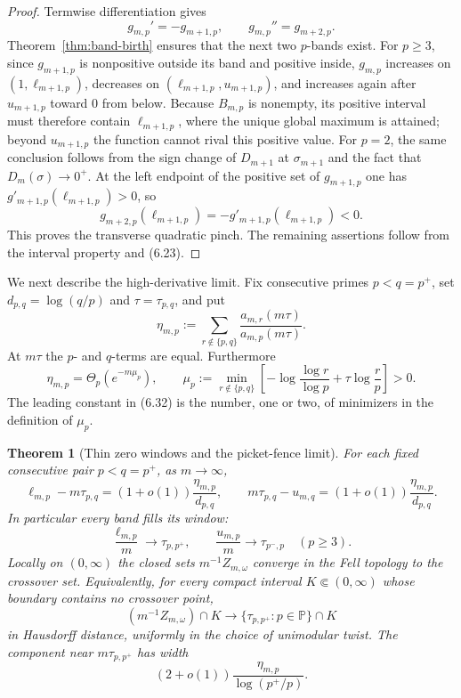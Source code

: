 \documentclass[11pt]{article}
\newtheorem{theorem}{Theorem}[section]
\theoremstyle{definition}
\theoremstyle{remark}
\newcommand{\PP}{\mathbb P}
\begin{document}
\begin{proof}
Termwise differentiation gives
\[
 g_{m,p}'=-g_{m+1,p},\qquad g_{m,p}''=g_{m+2,p}.
\tag{6.30}
\]
Theorem~\ref{thm:band-birth} ensures that the next two $p$-bands exist.
For $p\ge3$, since $g_{m+1,p}$ is nonpositive outside its band and positive
inside, $g_{m,p}$ increases on $(1,\ell_{m+1,p})$, decreases on
$(\ell_{m+1,p},u_{m+1,p})$, and increases again after $u_{m+1,p}$ toward
$0$ from below.  Because $B_{m,p}$ is nonempty, its positive interval must
therefore contain $\ell_{m+1,p}$, where the unique global maximum is
attained; beyond $u_{m+1,p}$ the function cannot rival this positive value.
For $p=2$, the same conclusion follows from the sign change of
$D_{m+1}$ at $\sigma_{m+1}$ and the fact that $D_m(\sigma)\to0^+$.
At the left endpoint of the positive set of
$g_{m+1,p}$ one has $g'_{m+1,p}(\ell_{m+1,p})>0$, so
\[
 g_{m+2,p}(\ell_{m+1,p})=-g'_{m+1,p}(\ell_{m+1,p})<0.
\]
This proves the transverse quadratic pinch.
The remaining assertions follow from the interval property and (6.23).
\end{proof}

We next describe the high-derivative limit.  Fix consecutive primes
$p<q=p^+$, set $d_{p,q}=\log(q/p)$ and $\tau=\tau_{p,q}$, and put
\[
 \eta_{m,p}:=
 \sum_{r\notin\{p,q\}}
 \frac{a_{m,r}(m\tau)}{a_{m,p}(m\tau)}.
\tag{6.31}
\]
At $m\tau$ the $p$- and $q$-terms are equal.  Furthermore
\[
 \eta_{m,p}=\Theta_p(e^{-m\mu_p}),\qquad
 \mu_p:=\min_{r\notin\{p,q\}}
 \left[-\log\frac{\log r}{\log p}+\tau\log\frac rp\right]>0.
\tag{6.32}
\]
The leading constant in (6.32) is the number, one or two, of minimizers in
the definition of $\mu_p$.

\begin{theorem}[Thin zero windows and the picket-fence limit]
\label{thm:picket-fence}
For each fixed consecutive pair $p<q=p^+$, as $m\to\infty$,
\[
 \ell_{m,p}-m\tau_{p,q}
  =(1+o(1))\frac{\eta_{m,p}}{d_{p,q}},
 \qquad
 m\tau_{p,q}-u_{m,q}
  =(1+o(1))\frac{\eta_{m,p}}{d_{p,q}}.
\tag{6.33}
\]
In particular every band fills its window:
\[
 \frac{\ell_{m,p}}m\longrightarrow\tau_{p,p^+},
 \qquad
 \frac{u_{m,p}}m\longrightarrow\tau_{p^-,p}\quad(p\ge3).
\tag{6.34}
\]
Locally on $(0,\infty)$ the closed sets $m^{-1}Z_{m,\omega}$ converge in the
Fell topology to the crossover set.  Equivalently, for every compact interval
$K\Subset(0,\infty)$ whose boundary contains no crossover point,
\[
 \left(m^{-1}Z_{m,\omega}\right)\cap K
 \longrightarrow
 \{\tau_{p,p^+}:p\in\PP\}\cap K
\tag{6.35}
\]
in Hausdorff distance, uniformly in the choice of unimodular twist.
The component near $m\tau_{p,p^+}$ has width
\[
 (2+o(1))\frac{\eta_{m,p}}{\log(p^+/p)}.
\tag{6.36}
\]
\end{theorem}
\end{document}
